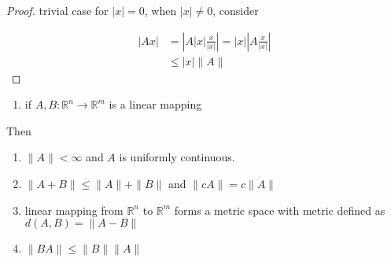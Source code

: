 \begin{proof}
    trivial case for $|x| = 0$, when $|x| \ne 0$, consider

    \begin{align*}
        \left| A x \right| &= \left| A |x| \frac{x}{|x|} \right| = |x| \left| A \frac{x}{|x|} \right| \\
        & \le |x| \| A \|
    \end{align*}
\end{proof}

\begin{thm}
    \begin{enumerate}
        \item if $A, B: \mathbb{R}^n \to \mathbb{R}^m$ is a linear mapping
    \end{enumerate}

    Then

    \begin{enumerate}
        \item $\| A\| < \infty$ and $A$ is uniformly continuous.

        \item $\| A + B\| \le \| A \| + \| B \|$ and $\| c A\| = c \| A \|$

        \item linear mapping from $\mathbb{R}^n$ to $\mathbb{R}^m$ forms a metric space
        with metric defined as $d(A,B) = \| A - B\|$

        \item $\| BA\| \le \|B\| \| A\|$
    \end{enumerate}
\end{thm}


